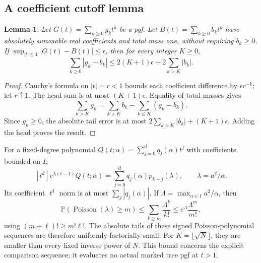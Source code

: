 \documentclass[11pt]{article}
\newtheorem{lemma}[theorem]{Lemma}
\theoremstyle{definition}
\newcommand{\Prob}{\mathbb P}
\begin{document}
\subsection{A coefficient cutoff lemma}
\begin{lemma}\label{mct:lem:cutoff}
Let $G(t)=\sum_{k\ge0}g_kt^k$ be a pgf. Let $B(t)=\sum_{k\ge0}b_kt^k$ have absolutely summable real coefficients and total mass one, without requiring $b_k\ge0$. If
$\sup_{|t|\le1}|G(t)-B(t)|\le\epsilon$, then for every integer $K\ge0$,
\[
 \sum_{k\ge0}|g_k-b_k|
 \le2(K+1)\epsilon+2\sum_{k>K}|b_k|.
\]
\end{lemma}
\begin{proof}
Cauchy's formula on $|t|=r<1$ bounds each coefficient difference by $\epsilon r^{-k}$; let $r\uparrow1$. The head sum is at most $(K+1)\epsilon$. Equality of total masses gives
\[
 \sum_{k>K}g_k=\sum_{k>K}b_k-\sum_{k\le K}(g_k-b_k).
\]
Since $g_k\ge0$, the absolute tail error is at most $2\sum_{k>K}|b_k|+(K+1)\epsilon$. Adding the head proves the result.
\end{proof}
For a fixed-degree polynomial $Q(t;\alpha)=\sum_{j=0}^d q_j(\alpha)t^j$ with coefficients bounded on $I$,
\[
 [t^k]e^{\lambda(t-1)}Q(t;\alpha)=\sum_{j=0}^d q_j(\alpha)p_{k-j}(\lambda),
 \qquad \lambda=a^2/\alpha.
\]
Its coefficient $\ell^1$ norm is at most $\sum_j|q_j(\alpha)|$. If $\Lambda=\max_{\alpha\in I}a^2/\alpha$, then
\[
 \Prob(\operatorname{Poisson}(\lambda)\ge m)
 \le\sum_{k\ge m}\frac{\Lambda^k}{k!}
 \le e^\Lambda\frac{\Lambda^m}{m!},
\]
using $(m+\ell)!\ge m!\ell!$. The absolute tails of these signed Poisson-polynomial sequences are therefore uniformly factorially small. For $K=\lfloor\sqrt N\rfloor$, they are smaller than every fixed inverse power of $N$. This bound concerns the explicit comparison sequence; it evaluates no actual marked tree pgf at $t>1$.
\end{document}
